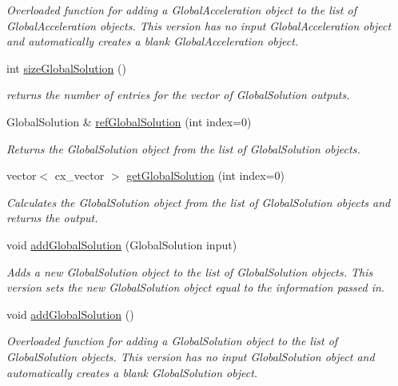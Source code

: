 \begin{DoxyCompactItemize}
\begin{DoxyCompactList}\small\item\em Overloaded function for adding a Global\-Acceleration object to the list of Global\-Acceleration objects. This version has no input Global\-Acceleration object and automatically creates a blank Global\-Acceleration object. \end{DoxyCompactList}\item 
int \hyperlink{class_outputs_body_abe9227589bf83ee0ff40251e6e0d8d27}{size\-Global\-Solution} ()
\begin{DoxyCompactList}\small\item\em returns the number of entries for the vector of Global\-Solution outputs. \end{DoxyCompactList}\item 
Global\-Solution \& \hyperlink{class_outputs_body_a7480b88e4d67c84a2c540127c93a15d2}{ref\-Global\-Solution} (int index=0)
\begin{DoxyCompactList}\small\item\em Returns the Global\-Solution object from the list of Global\-Solution objects. \end{DoxyCompactList}\item 
vector$<$ cx\-\_\-vector $>$ \hyperlink{class_outputs_body_a0f669819a398d64524a4aff29e20aa8b}{get\-Global\-Solution} (int index=0)
\begin{DoxyCompactList}\small\item\em Calculates the Global\-Solution object from the list of Global\-Solution objects and returns the output. \end{DoxyCompactList}\item 
void \hyperlink{class_outputs_body_a75283b4dd4533851008431eb84341919}{add\-Global\-Solution} (Global\-Solution input)
\begin{DoxyCompactList}\small\item\em Adds a new Global\-Solution object to the list of Global\-Solution objects. This version sets the new Global\-Solution object equal to the information passed in. \end{DoxyCompactList}\item 
\hypertarget{class_outputs_body_a13ae87153fcf43774b970aad94f0ca27}{void \hyperlink{class_outputs_body_a13ae87153fcf43774b970aad94f0ca27}{add\-Global\-Solution} ()}\label{class_outputs_body_a13ae87153fcf43774b970aad94f0ca27}

\begin{DoxyCompactList}\small\item\em Overloaded function for adding a Global\-Solution object to the list of Global\-Solution objects. This version has no input Global\-Solution object and automatically creates a blank Global\-Solution object. \end{DoxyCompactList}\end{DoxyCompactItemize}
